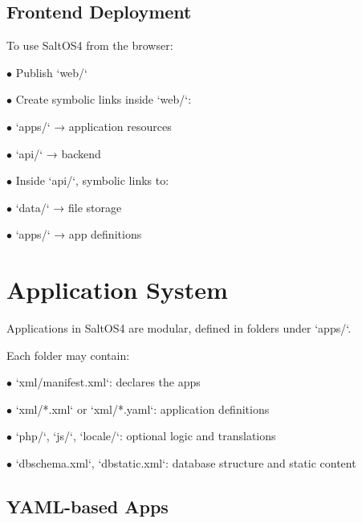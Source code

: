 \documentclass[a4paper]{article}
\begin{document}
\hypertarget{toc12}{}
\subsection{Frontend Deployment}

To use SaltOS4 from the browser:

\begin{compactitem}
\item[\color{myblue}$\bullet$] Publish `web/`
\item[\color{myblue}$\bullet$] Create symbolic links inside `web/`:
  \begin{compactitem}
  \item[\color{myblue}$\bullet$] `apps/` → application resources
  \item[\color{myblue}$\bullet$] `api/` → backend
  \end{compactitem}
\item[\color{myblue}$\bullet$] Inside `api/`, symbolic links to:
  \begin{compactitem}
  \item[\color{myblue}$\bullet$] `data/` → file storage
  \item[\color{myblue}$\bullet$] `apps/` → app definitions
  \end{compactitem}
\end{compactitem}


\hypertarget{toc13}{}
\section{Application System}

Applications in SaltOS4 are modular, defined in folders under `apps/`.

Each folder may contain:

\begin{compactitem}
\item[\color{myblue}$\bullet$] `xml/manifest.xml`: declares the apps
\item[\color{myblue}$\bullet$] `xml/*.xml` or `xml/*.yaml`: application definitions
\item[\color{myblue}$\bullet$] `php/`, `js/`, `locale/`: optional logic and translations
\item[\color{myblue}$\bullet$] `dbschema.xml`, `dbstatic.xml`: database structure and static content
\end{compactitem}

\hypertarget{toc14}{}
\subsection{YAML-based Apps}
\end{document}
